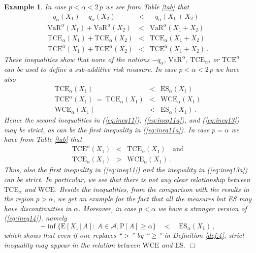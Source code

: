 \documentclass[11pt,a4paper,leqno]{article}
\newtheorem{example}[theorem]{Example}
\begin{document}
\begin{example}
In case $p <\alpha<2\,p$ we see from Table \ref{tab} that
\begin{eqnarray*}
- q_\alpha{(X_1)} -  q_\alpha{(X_2)} & < &   - q_\alpha{(X_1 + X_2)}\\
\mathrm{VaR}^\alpha{(X_1)} +  \mathrm{VaR}^\alpha{(X_2)} & < &   \mathrm{VaR}^\alpha{(X_1 + X_2)}\\
\mathrm{TCE}_\alpha{(X_1)} +  \mathrm{TCE}_\alpha{(X_2)} & < &   \mathrm{TCE}_\alpha{(X_1 + X_2)}\\
\mathrm{TCE}^\alpha{(X_1)} +  \mathrm{TCE}^\alpha{(X_2)} & < &
\mathrm{TCE}^\alpha{(X_1 + X_2)}\,.
\end{eqnarray*}
These inequalities show that 
none of the notions  
$- q_{\alpha}$, $\mathrm{VaR}^{\alpha}$, $\mathrm{TCE}_\alpha$, or
$\mathrm{TCE}^\alpha$ can be used to define a sub-additive risk measure.
In case $p <\alpha<2\,p$ we have also
\begin{eqnarray}
\mathrm{TCE}_\alpha{(X_1)} & < &\mathrm{ES}_\alpha(X_1)\nonumber\\
\mathrm{TCE}^\alpha{(X_1)} \ = \ \mathrm{TCE}_\alpha{(X_1)} & < &\mathrm{WCE}_\alpha{(X_1)}\nonumber\\ 
\mathrm{WCE}_\alpha{(X_1)} & < &\mathrm{ES}_\alpha(X_1)\,. \label{eq:ineq14}
\end{eqnarray}
Hence the second inequalities in (\ref{eq:ineq11}), (\ref{eq:ineq11a}), and
(\ref{eq:ineq13})
may be strict, as can be the first inequality in (\ref{eq:ineq11a}).
In case $p =\alpha$ we have from Table \ref{tab} that 
\begin{eqnarray*}
\mathrm{TCE}^\alpha{(X_1)} & < &  \mathrm{TCE}_\alpha{(X_1)}\quad \mbox{and}\\
\mathrm{TCE}_\alpha{(X_1)} & > &  \mathrm{WCE}_\alpha{(X_1)}\,.
\end{eqnarray*}
Thus, also the first inequality in (\ref{eq:ineq11}) and the inequality in
(\ref{eq:ineq13a})
can be strict. In particular, we see that there is not any clear relationship
between
$\mathrm{TCE}_\alpha$ and $\mathrm{WCE}$.
Beside the inequalities, from the comparison with the results in the region $p>\alpha$, we get an example for the fact
that all the measures but ES may have discontinuities in $\alpha$. 
Moreover, in case $p < \alpha$ we have a stronger version of (\ref{eq:ineq14}), namely
$$
- \inf\{ \mathrm{E}[X_1\,|\,A]:\ A\in \mathcal{A}, \mathrm{P}[A]\ge \alpha\} \quad < \quad \mathrm{ES}_\alpha(X_1)\,,
$$
which shows that even if one replaces ``$>$'' by ``$\ge$'' in Definition \ref{def:4}, strict inequality may appear
in the relation between $\mathrm{WCE}$ and $\mathrm{ES}$. \hfill $\Box$
\end{example}
\end{document}
